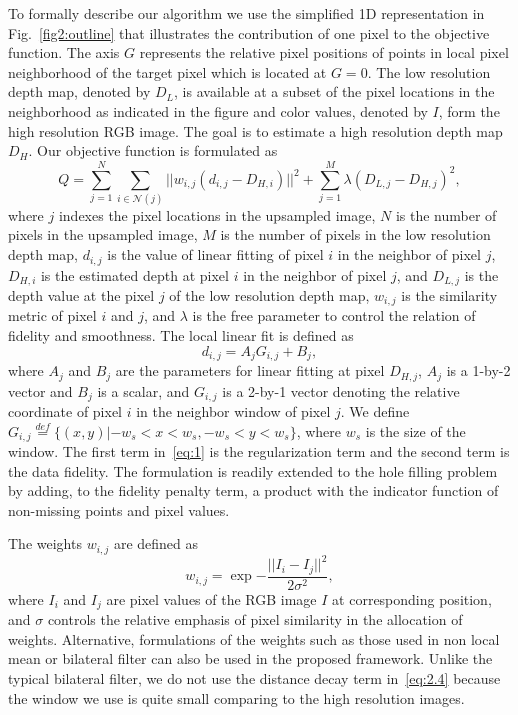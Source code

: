 To formally describe our algorithm we use the simplified 1D representation in Fig.~\ref{fig2:outline} that illustrates the contribution of one pixel to the objective function. The axis $G$ represents the relative pixel positions of points in local pixel neighborhood of the target pixel which is located at $G=0$. The low resolution depth map, denoted by $D_{L}$, is available at a subset of the pixel locations in the neighborhood as indicated in the figure and color values, denoted by $I$, form the high resolution RGB image. The goal is to estimate a high resolution depth map $D_H$. Our objective function is formulated as
\begin{equation}
Q = \sum_{j=1}^{N}{\sum_{i\in \mathcal{N}(j)}{||w_{i,j}(d_{i,j}-D_{H,i})||^2}}+\sum_{j=1}^{M}{{\lambda}(D_{L,j}-D_{H,j})^2},
\label{eq:2.1}
\end{equation}
where $j$ indexes the pixel locations in the upsampled image, $N$ is the number of pixels in the upsampled image, $M$ is the number of pixels in the low resolution depth map, $d_{i,j}$ is the value of linear fitting of pixel $i$ in the neighbor of pixel $j$, $D_{H,i}$ is the estimated depth at pixel $i$ in the neighbor of pixel $j$, and $D_{L,j}$ is the depth value at the pixel $j$ of the low resolution depth map, $w_{i,j}$ is the similarity metric of pixel $i$ and $j$, and $\lambda$ is the free parameter to control the relation of fidelity and smoothness. The local linear fit is defined as
\begin{equation}
d_{i,j} = A_{j}G_{i,j}+B_{j},
\label{eq:2.2}
\end{equation}
where $A_{j}$ and $B_{j}$ are the parameters for linear fitting at pixel $D_{H,j}$, $A_{j}$ is a 1-by-2 vector and $B_{j}$ is a scalar, and $G_{i,j}$ is a 2-by-1 vector denoting the relative coordinate of pixel $i$ in the neighbor window of pixel $j$. We define $G_{i,j}\overset{def}{=}\{(x,y)|-w_{s}<x<w_{s},-w_{s}<y<w_{s}\}$, where $w_{s}$ is the size of the window. The first term in~\eqref{eq:1} is the regularization term and the second term is the data fidelity. The formulation is readily extended to the hole filling problem by adding, to the fidelity penalty term, a product with the indicator function of non-missing points and pixel values.

The weights $w_{i,j}$ are defined as
\begin{equation}
w_{i,j} = \exp{-\frac{||I_{i}-I_{j}||^2}{2\sigma^2}},
\label{eq:2.4}
\end{equation}
where $I_{i}$ and $I_{j}$ are pixel values of the RGB image $I$ at corresponding position, and $\sigma$ controls the relative emphasis of pixel similarity in the allocation of weights. Alternative, formulations of the weights such as those used in non local mean or bilateral filter can also be used in the proposed framework. Unlike the typical bilateral filter, we do not use the distance decay term in~\eqref{eq:2.4} because the window we use is quite small comparing to the high resolution images. 


